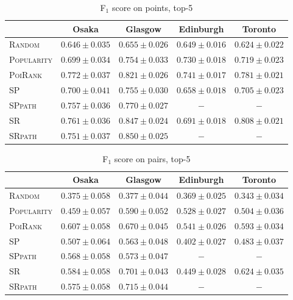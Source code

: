\begin{table*}[t]
\caption{F$_1$ score on points, top-5}
\label{tab:f1}
\centering
\begin{tabular}{l|cccc} \hline
 & Osaka & Glasgow & Edinburgh & Toronto \\ \hline
\textsc{Random} & $0.646\pm0.035$ & $0.655\pm0.026$ & $0.649\pm0.016$ & $0.624\pm0.022$ \\
\textsc{Popularity} & $0.699\pm0.034$ & $0.754\pm0.033$ & $\mathit{0.730\pm0.018}$ & $0.719\pm0.023$ \\
\textsc{PoiRank} & $\mathbf{0.772\pm0.037}$ & $0.821\pm0.026$ & $\mathbf{0.741\pm0.017}$ & $\mathit{0.781\pm0.021}$ \\
\textsc{SP} & $0.700\pm0.041$ & $0.755\pm0.030$ & $0.658\pm0.018$ & $0.705\pm0.023$ \\
\textsc{SPpath} & $0.757\pm0.036$ & $0.770\pm0.027$ & $-$ & $-$ \\
\textsc{SR} & $\mathit{0.761\pm0.036}$ & $\mathit{0.847\pm0.024}$ & $0.691\pm0.018$ & $\mathbf{0.808\pm0.021}$ \\
\textsc{SRpath} & $0.751\pm0.037$ & $\mathbf{0.850\pm0.025}$ & $-$ & $-$ \\
\hline
\end{tabular}
\end{table*}


\begin{table*}[t]
\caption{F$_1$ score on pairs, top-5}
\label{tab:pf1}
\centering
\begin{tabular}{l|cccc} \hline
 & Osaka & Glasgow & Edinburgh & Toronto \\ \hline
\textsc{Random} & $0.375\pm0.058$ & $0.377\pm0.044$ & $0.369\pm0.025$ & $0.343\pm0.034$ \\
\textsc{Popularity} & $0.459\pm0.057$ & $0.590\pm0.052$ & $\mathit{0.528\pm0.027}$ & $0.504\pm0.036$ \\
\textsc{PoiRank} & $\mathbf{0.607\pm0.058}$ & $0.670\pm0.045$ & $\mathbf{0.541\pm0.026}$ & $\mathit{0.593\pm0.034}$ \\
\textsc{SP} & $0.507\pm0.064$ & $0.563\pm0.048$ & $0.402\pm0.027$ & $0.483\pm0.037$ \\
\textsc{SPpath} & $0.568\pm0.058$ & $0.573\pm0.047$ & $-$ & $-$ \\
\textsc{SR} & $\mathit{0.584\pm0.058}$ & $\mathit{0.701\pm0.043}$ & $0.449\pm0.028$ & $\mathbf{0.624\pm0.035}$ \\
\textsc{SRpath} & $0.575\pm0.058$ & $\mathbf{0.715\pm0.044}$ & $-$ & $-$ \\
\hline
\end{tabular}
\end{table*}



